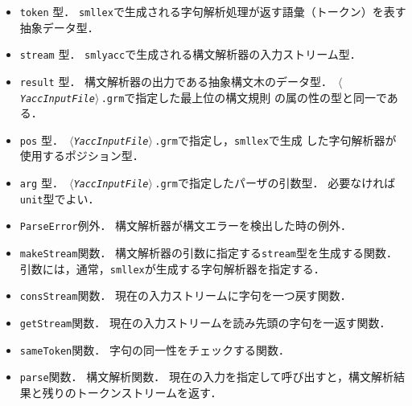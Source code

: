 \documentclass{jbook}
\newcommand{\code}[1]{\mbox{\large\tt #1}}
\newcommand{\nonterm}[1]{\mbox{$\,\langle$}{\it #1}\mbox{$\rangle\,$}}
\begin{document}
\ifjp%
\begin{itemize}
\item \code{token} 型．
	\code{smllex}で生成される字句解析処理が返す語彙（トークン）を表す抽象データ型．
\item \code{stream} 型．
	\code{smlyacc}で生成される構文解析器の入力ストリーム型．
\item \code{result} 型．
	構文解析器の出力である抽象構文木のデータ型．
	\code{\nonterm{YaccInputFile}.grm}で指定した最上位の構文規則
の属の性の型と同一である．
\item \code{pos} 型．
	\code{\nonterm{YaccInputFile}.grm}で指定し，\code{smllex}で生成
した字句解析器が使用するポジション型．
\item \code{arg} 型．
	\code{\nonterm{YaccInputFile}.grm}で指定したパーザの引数型．
	必要なければ\code{unit}型でよい．
\item \code{ParseError}例外．
	構文解析器が構文エラーを検出した時の例外．
\item \code{makeStream}関数．
	構文解析器の引数に指定する\code{stream}型を生成する関数．
	引数には，通常，\code{smllex}が生成する字句解析器を指定する．
\item \code{consStream}関数．
	現在の入力ストリームに字句を一つ戻す関数．
\item \code{getStream}関数．
	現在の入力ストリームを読み先頭の字句を一返す関数．
\item \code{sameToken}関数．
	字句の同一性をチェックする関数．
\item \code{parse}関数．
	構文解析関数．
	現在の入力を指定して呼び出すと，構文解析結果と残りのトークンストリームを返す．
\end{itemize}	
\else%
\end{document}

